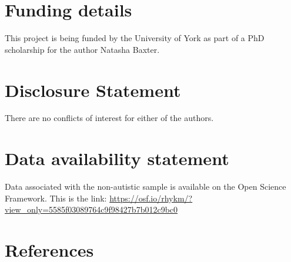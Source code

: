 \documentclass[
]{article}
\begin{document}
\hypertarget{funding-details}{%
\section*{Funding details}\label{funding-details}}

This project is being funded by the University of York as part of a PhD scholarship for the author Natasha Baxter.

\hypertarget{disclosure-statement}{%
\section*{Disclosure Statement}\label{disclosure-statement}}

There are no conflicts of interest for either of the authors.

\hypertarget{data-availability-statement}{%
\section*{Data availability statement}\label{data-availability-statement}}

Data associated with the non-autistic sample is available on the Open Science Framework. This is the link: \url{https://osf.io/rhykm/?view_only=5585f03089764c9f98427b7b012c9bc0}

\hypertarget{references}{%
\section*{References}\label{references}}
\end{document}
